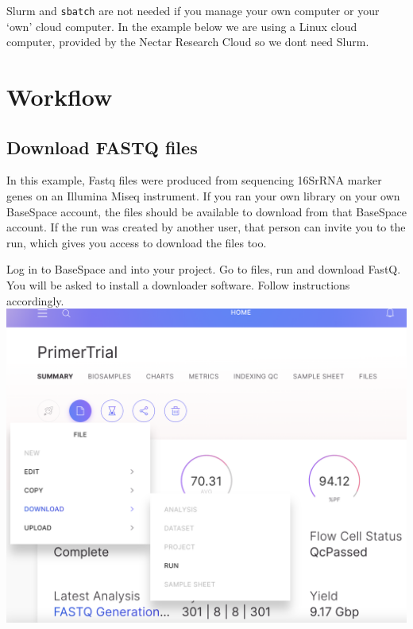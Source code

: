 \documentclass[
]{book}
\begin{document}
Slurm and \texttt{sbatch} are not needed if you manage your own computer or your `own' cloud computer. In the example below we are using a Linux cloud computer, provided by the Nectar Research Cloud so we dont need Slurm.

\hypertarget{workflow-1}{%
\section{Workflow}\label{workflow-1}}

\hypertarget{download-fastq-files}{%
\subsection{Download FASTQ files}\label{download-fastq-files}}

In this example, Fastq files were produced from sequencing 16SrRNA marker genes on an Illumina Miseq instrument. If you ran your own library on your own BaseSpace account, the files should be available to download from that BaseSpace account. If the run was created by another user, that person can invite you to the run, which gives you access to download the files too.

Log in to BaseSpace and into your project. Go to files, run and download FastQ. You will be asked to install a downloader software. Follow instructions accordingly.\\
\includegraphics{./img/basespacedownload.png}
\end{document}
